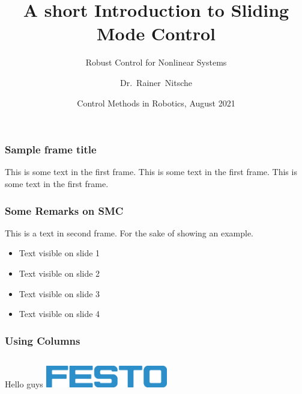 \documentclass{beamer}
\title[Sliding Mode Control] %
{A short Introduction to Sliding Mode Control}
\subtitle{Robust Control for Nonlinear Systems}
\author[Rainer Nitsche] %
{Dr.~Rainer~Nitsche\inst{1}} %
\institute[Festo SE \& Co. KG] %
{
  \inst{1}%
  Dept. Robotics\\
 System Design Group
}
\date[ \today] %
{Control Methods in Robotics, August 2021}
\begin{document}
\frame{\titlepage}

\begin{frame}
\frametitle{Sample frame title}
This is some text in the first frame. This is some text in the first frame. This is some text in the first frame.
\end{frame}

\begin{frame}
\frametitle{Some Remarks on SMC}
This is a text in second frame. 
For the sake of showing an example.

\begin{itemize}
 \item<1-> Text visible on slide 1
 \item<2-> Text visible on slide 2
 \item<3> Text visible on slide 3
 \item<4-> Text visible on slide 4
\end{itemize}
\end{frame}

\begin{frame}
\frametitle{Using Columns}
\begin{columns}
Hello guys
\centering
\includegraphics[width=0.4\textwidth]{FESTO_RGB_080}
\end{columns}
\end{frame}
\end{document}
